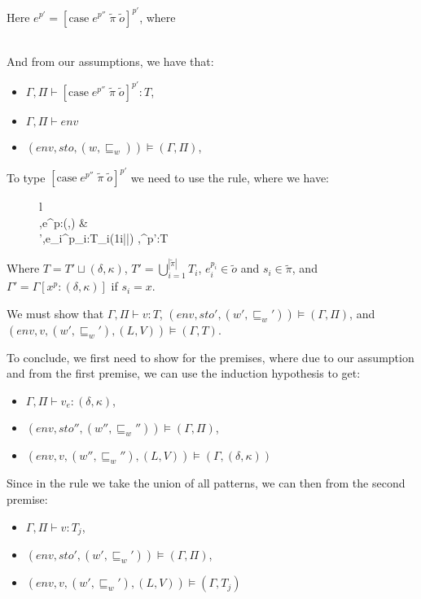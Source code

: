 \item[\runa{Case}] Here $e^{p'}=\left[\mbox{case}\;e^{p''}\;\tilde{\pi}\;\tilde{o}\right]^{p'}$, where
\begin{figure}[H]
	\setlength\tabcolsep{8pt}
	\begin{tabular}{l}
		
	\end{tabular}
\end{figure}

And from our assumptions, we have that:
\begin{itemize}
	\item $\Gamma,\Pi\vdash \left[\mbox{case}\;e^{p''}\;\tilde{\pi}\;\tilde{o}\right]^{p'}:T$,
	\item $\Gamma,\Pi\vdash env$
	\item $(env,sto,(w,\sqsubseteq_w))\models(\Gamma,\Pi)$,
\end{itemize}
To type $[\mbox{case}\;e^{p''}\;\tilde{\pi}\;\tilde{o}]^{p'}$ we need to use the  rule, where we have:
\begin{figure}[H]
	\setlength\tabcolsep{8pt}
	\begin{tabular}{l}
		\runa{T-Case}\\[0.2cm]
			\inference[]
				{\Gamma,\Pi\vdash e^{p}:(\delta,\kappa) &\\
				\Gamma',\Pi\vdash e_i^{p_i}:T_i\;\;\;(1\leq i\leq|\tilde{\pi}|)}
				{\Gamma,\Pi\vdash [\mbox{case}\;e^{p}\;\tilde{\pi}\;\tilde{o}]^{p'}:T}
	\end{tabular}
\end{figure}
Where $T=T'\sqcup(\delta,\kappa)$, $T'=\bigcup_{i=1}^{|\tilde{\pi}|}T_i$, $e_i^{p_i}\in\tilde{o}$ and $s_i\in\tilde{\pi}$, and $\Gamma'=\Gamma[x^p:(\delta,\kappa)]$ if $s_i=x$.

We must show that  $\Gamma,\Pi\vdash v:T$,  $(env,sto',(w',\sqsubseteq_w'))\models(\Gamma,\Pi)$, and \\
 $(env,v,(w',\sqsubseteq_w'),(L,V))\models(\Gamma,T)$.

To conclude, we first need to show for the premises, where due to our assumption and from the first premise, we can use the induction hypothesis to get:
\begin{itemize}
	\item $\Gamma,\Pi\vdash v_e:(\delta,\kappa)$,
	\item $(env,sto'',(w'',\sqsubseteq_w''))\models(\Gamma,\Pi)$,
	\item $(env,v,(w'',\sqsubseteq_w''),(L,V))\models(\Gamma,(\delta,\kappa))$
\end{itemize}
Since in the rule  we take the union of all patterns, we can then from the second premise:
\begin{itemize}
	\item $\Gamma,\Pi\vdash v:T_j$,
	\item $(env,sto',(w',\sqsubseteq_w'))\models(\Gamma,\Pi)$,
	\item $(env,v,(w',\sqsubseteq_w'),(L,V))\models(\Gamma,T_j)$
\end{itemize}

